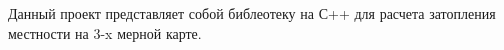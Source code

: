 Данный проект представляет собой библеотеку на С++ для расчета затопления местности на 3-\/x мерной карте. 